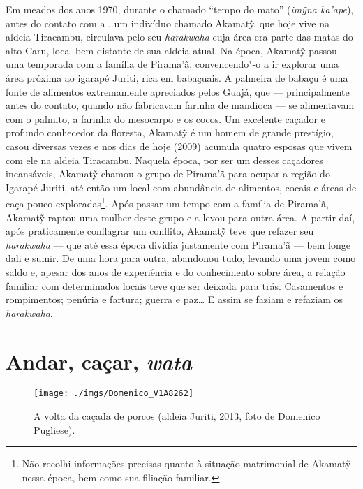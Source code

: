\forceindent Em meados dos anos 1970, durante o chamado ``tempo do mato'' (\emph{imỹna
ka'ape}), antes do contato com a , um indivíduo chamado Akamatỹ,
que hoje vive na aldeia Tiracambu, circulava pelo seu \emph{harakwaha}
cuja área era parte das matas do alto Caru, local bem distante de sua
aldeia atual. Na época, Akamatỹ passou uma temporada com a família de
Pirama'ã, convencendo"-o a ir explorar uma área próxima ao igarapé
Juriti, rica em babaçuais. A palmeira de babaçu é uma fonte de alimentos
extremamente apreciados pelos Guajá, que --- principalmente antes do
contato, quando não fabricavam farinha de mandioca --- se alimentavam com
o palmito, a farinha do mesocarpo e os cocos. Um excelente caçador e
profundo conhecedor da floresta, Akamatỹ é um homem de grande prestígio,
casou diversas vezes e nos dias de hoje (2009) acumula quatro esposas
que vivem com ele na aldeia Tiracambu. Naquela época, por ser um desses
caçadores incansáveis, Akamatỹ chamou o grupo de Pirama'ã para ocupar a
região do Igarapé Juriti, até então um local com abundância de
alimentos, cocais e áreas de caça pouco exploradas\footnote{Não recolhi
  informações precisas quanto à situação matrimonial de Akamatỹ nessa
  época, bem como sua filiação familiar.}. Após passar um tempo com a
família de Pirama'ã, Akamatỹ raptou uma mulher deste grupo e a levou
para outra área. A partir daí, após praticamente conflagrar um conflito,
Akamatỹ teve que refazer seu \emph{harakwaha} --- que até essa época
dividia justamente com Pirama'ã --- bem longe dali e sumir. De uma hora
para outra, abandonou tudo, levando uma jovem como saldo e, apesar dos
anos de experiência e do conhecimento sobre área, a relação familiar com
determinados locais teve que ser deixada para trás. Casamentos e
rompimentos; penúria e fartura; guerra e paz\ldots{} E assim se faziam e
refaziam os \emph{harakwaha}.

\section{Andar, caçar, \emph{wata}}

\begin{figure}[H]
\centering
  \texttt{[image: ./imgs/Domenico\_V1A8262]}
\caption{A volta da caçada de porcos (aldeia Juriti, 2013, foto de Domenico Pugliese).}
\end{figure}

